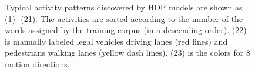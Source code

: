 \begin{figure}[!htbp]
	\caption[Typical activities in QMUL Junction 2 Dataset]
	{Typical activity patterns discovered by HDP models are shown as (1)- (21). The activities are sorted according to the number of the words assigned by the training corpus (in a descending order). (22) is manually labeled legal vehicles driving lanes (red lines) and pedestrians walking lanes (yellow dash lines). (23) is the colors for 8 motion directions.}
	\label{qmul2_activity}
\end{figure}



